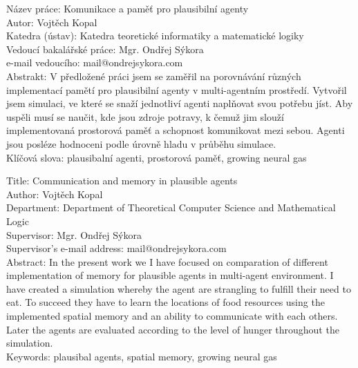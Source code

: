 \documentclass[12pt,a4paper]{report}
\begin{document}
\setcounter{tocdepth}{1}
\tableofcontents %

\newpage %

\noindent
Název práce: Komunikace a pamě\v{t} pro plausibilní agenty\\
Autor: Vojtěch Kopal\\
Katedra (ústav): Katedra teoretické informatiky a matematické logiky\\
Vedoucí bakalářské práce: Mgr. Ondřej Sýkora\\
e-mail vedoucího: mail@ondrejsykora.com\\

\noindent Abstrakt:  V předložené práci jsem se zaměřil na porovnávání různých implementací pamětí pro plausibilní agenty v multi-agentním prostředí. Vytvořil jsem simulaci, ve které se snaží jednotliví agenti naplňovat svou potřebu jíst. Aby uspěli musí se naučit, kde jsou zdroje potravy, k čemuž jim slouží implementovaná prostorová paměť a schopnost komunikovat mezi sebou. Agenti jsou posléze hodnoceni podle úrovně hladu v průběhu simulace. \\

\noindent Klíčová slova: plausibalní agenti, prostorová paměť, growing neural gas 

\vspace{10mm}

\noindent
Title: Communication and memory in plausible agents\\
Author: Vojtěch Kopal\\
Department: Department of Theoretical Computer Science and Mathematical Logic\\
Supervisor: Mgr. Ondřej Sýkora\\
Supervisor's e-mail address: mail@ondrejsykora.com\\

\noindent Abstract: In the present work we I have focused on comparation of different implementation of memory for plausible agents in multi-agent environment. I have created a simulation whereby the agent are strangling to fulfill their need to eat. To succeed they have to learn the locations of food resources using the implemented spatial memory and an ability to communicate with each others. Later the agents are evaluated according to the level of hunger throughout the simulation.\\

\noindent Keywords: plausibal agents, spatial memory, growing neural gas
\end{document}
